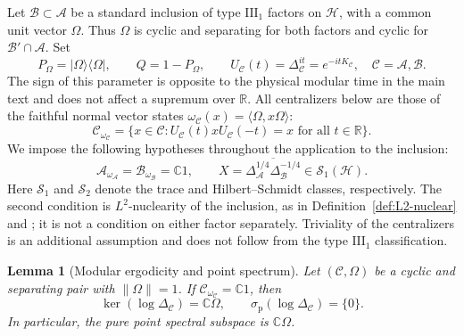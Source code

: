 \documentclass[a4paper,11pt]{article}
\newtheorem{lemma}[theorem]{Lemma}
\theoremstyle{definition}
\begin{document}
Let $\mathcal B\subset\mathcal A$ be a standard inclusion of type $\mathrm{III}_1$ factors on $\mathcal H$, with a common unit vector $\Omega$. Thus $\Omega$ is cyclic and separating for both factors and cyclic for $\mathcal B'\cap\mathcal A$. Set
\begin{equation}
 P_\Omega=|\Omega\rangle\langle\Omega|,\qquad Q=1-P_\Omega,\qquad
 U_{\mathcal C}(t)=\Delta_{\mathcal C}^{it}=e^{-itK_{\mathcal C}},
 \quad \mathcal C=\mathcal A,\mathcal B .
 \label{eq:appC-conventions}
\end{equation}
The sign of this parameter is opposite to the physical modular time in the main text and does not affect a supremum over $\mathbb R$. All centralizers below are those of the faithful normal vector states $\omega_{\mathcal C}(x)=\langle\Omega,x\Omega\rangle$:
\begin{equation}
 \mathcal C_{\omega_{\mathcal C}}
 =\{x\in\mathcal C:U_{\mathcal C}(t)xU_{\mathcal C}(-t)=x
 \text{ for all }t\in\mathbb R\}.
 \label{eq:appC-centralizers}
\end{equation}
We impose the following hypotheses throughout the application to the inclusion:
\begin{equation}
 \mathcal A_{\omega_{\mathcal A}}=\mathcal B_{\omega_{\mathcal B}}=\mathbb C1,
 \qquad
 X=\overline{\Delta_{\mathcal A}^{1/4}\Delta_{\mathcal B}^{-1/4}}
 \in\mathcal S_1(\mathcal H).
 \label{eq:appC-nuclear}
\end{equation}
Here $\mathcal S_1$ and $\mathcal S_2$ denote the trace and Hilbert--Schmidt classes, respectively. The second condition is $L^2$-nuclearity of the inclusion, as in Definition~\ref{def:L2-nuclear} and \cite[Section~5]{BDL2007}; it is not a condition on either factor separately. Triviality of the centralizers is an additional assumption and does not follow from the type $\mathrm{III}_1$ classification.

\begin{lemma}[Modular ergodicity and point spectrum]\label{lem:appC-no-point-spectrum}
Let $(\mathcal C,\Omega)$ be a cyclic and separating pair with $\|\Omega\|=1$. If $\mathcal C_{\omega_{\mathcal C}}=\mathbb C1$, then
\begin{equation}
 \ker(\log\Delta_{\mathcal C})=\mathbb C\Omega,
 \qquad
 \sigma_{\mathrm p}(\log\Delta_{\mathcal C})=\{0\}.
 \label{eq:appC-modular-point-spectrum}
\end{equation}
In particular, the pure point spectral subspace is $\mathbb C\Omega$.
\end{lemma}
\end{document}
